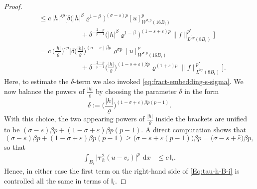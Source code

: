 \documentclass[10pt,letterpaper]{amsart}
\theoremstyle{definition}
\numberwithin{theorem}{section}
\numberwithin{equation}{section}
\newcommand{\1}{\ensuremath{\mathds{1}}}
\newcommand\sfI{{\boldsymbol{\mathsf I}}}
\renewcommand{\epsilon}{\varepsilon}
\renewcommand{\rho}{\varrho}
\renewcommand{\epsilon}{\varepsilon}
\renewcommand{\rho}{\varrho}
\renewcommand{\d}{\:\! \mathrm{d}}
\numberwithin{equation}{section}
\begin{document}
\begin{proof}
\begin{align*}
    &\le
    c\, |h|^{sp} \Big[\delta\big(|h|^\beta\rho^{1-\beta}\big)^{(\sigma-s)p} [u]_{W^{\sigma,p}(16B_i)}^p\\
    &\qquad\qquad\qquad
    +
    \delta^{-\frac{2-p}{p-1}} \big(|h|^\beta\rho^{1-\beta}\big)^{(1-s+\epsilon)p}
    \|f\|_{L^{\tilde\alpha p}(8B_i)}^{p'}\Big] \nonumber\\
    &=
    c\, \Big(\frac{|h|}{\rho}\Big)^{sp} 
    \bigg[\delta\Big(\frac{|h|}{\rho}\Big)^{(\sigma-s)\beta p} \rho^{\sigma p} [u]_{W^{\sigma,p}(16B_i)}^p \\
    &\qquad\qquad\qquad +
    \delta^{-\frac{2-p}{p-1}} \Big(\frac{|h|}{\rho}\Big)^{(1-s+\epsilon)\beta p}\rho^{(1+\epsilon)p}
    \|f\|_{L^{\tilde\alpha p}(8B_i)}^{p'}\bigg] .
\end{align*}
Here, to estimate the $\delta$-term we also invoked \eqref{eq:fract-embedding-s-sigma}.
We now balance the powers of $\frac{|h|}{\rho}$ by choosing the parameter $\delta$ in the form
\[
    \delta := \Big(\frac{|h|}{\rho}\Big)^{(1-\sigma+\varepsilon)\beta p(p-1)} .
\]
With this choice, the two appearing powers of $\frac{|h|}{\rho}$ inside
the brackets are unified to be
$(\sigma-s)\beta p + (1-\sigma+\varepsilon)\beta p(p-1)
$. A direct computation shows that 
$$
    (\sigma-s)\beta p + (1-\sigma+\epsilon)\beta p(p-1)
    \ge 
    \big(\sigma-s+\epsilon(p-1)\big)\beta p
    =
    \big(\sigma-s+\bar\epsilon\big)\beta p,
$$
so that 
\begin{align}\label{change-1<}
    \int_{B_i} \big|\boldsymbol\tau_h^2 (u - v_i)\big|^p \,\d x 
    &\le 
    c\,\sfI_i.
\end{align}  
Hence, in either case the first term on the right-hand side of \eqref{Eq:tau-h-B-i} is controlled all the same in terms of $\sfI_i$.


\end{proof}
\end{document}
